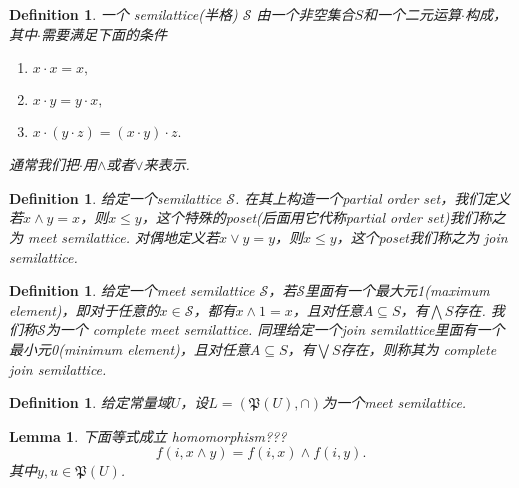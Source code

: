 \documentclass{article}
\newtheorem{lemma}[theorem]{Lemma}
\newtheorem{definition}[theorem]{Definition}
\begin{document}
\begin{definition}
\rm 一个{\color{red} semilattice(半格)} $\mathcal{S}$ 由一个非空集合$S$和一个二元运算$\cdot$构成，其中$\cdot$需要满足下面的条件
\begin{enumerate}
	\item $x \cdot x = x,$
	\item $x \cdot y =  y \cdot x,$
	\item $x \cdot (y \cdot z) = (x \cdot y) \cdot z.$
\end{enumerate}
通常我们把$\cdot$用$\wedge$或者$\vee$来表示.
\end{definition}

\begin{definition}
\rm 给定一个semilattice $\mathcal{S}$. 在其上构造一个partial order set，我们定义若$x \wedge y = x$，则$x \leq y$，这个特殊的poset(后面用它代称partial order set)我们称之为{\color{red} meet semilattice}. 对偶地定义若$x \vee y = y$，则$x \leq y$，这个poset我们称之为{ \color{red} join semilattice}.
\end{definition}

\begin{definition}
\rm 给定一个meet semilattice $\mathcal{S}$，若$\mathcal{S}$里面有一个最大元1(maximum element)，即对于任意的$x \in \mathcal{S}$，都有$x \wedge 1 = x$，且对任意$A \subseteq S$，有$\bigwedge S$存在. 我们称$\mathcal{S}$为一个{\color{red} complete meet semilattice}. 同理给定一个join semilattice里面有一个最小元0(minimum element)，且对任意$A \subseteq S$，有$\bigvee S$存在，则称其为{\color{red} complete join semilattice}.
\end{definition}

\begin{definition}
\rm 给定常量域$U$，设$L = (\mathfrak{P}(U),\cap)$为一个meet semilattice. 
\end{definition}

\begin{lemma}
\rm 下面等式成立 homomorphism???
$$
f(i,x \wedge y) = f(i,x) \wedge f(i,y).
$$
其中$y,u \in \mathfrak{P}(U)$.
\end{lemma}
\end{document}
